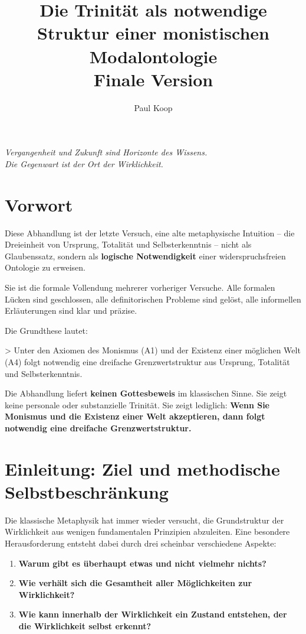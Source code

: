 \documentclass[
]{article}
\title{Die Trinität als notwendige Struktur einer monistischen Modalontologie \\ \large Finale Version}
\author{Paul Koop}
\date{}
\begin{document}
\maketitle

\begin{center}
\emph{Vergangenheit und Zukunft sind Horizonte des Wissens. \\ Die Gegenwart ist der Ort der Wirklichkeit.}
\end{center}

\newpage
{
\setcounter{tocdepth}{3}
\tableofcontents
}
\newpage

\section{Vorwort}\label{vorwort}

Diese Abhandlung ist der letzte Versuch, eine alte metaphysische Intuition – die Dreieinheit von Ursprung, Totalität und Selbsterkenntnis – nicht als Glaubenssatz, sondern als \textbf{logische Notwendigkeit} einer widerspruchsfreien Ontologie zu erweisen.

Sie ist die formale Vollendung mehrerer vorheriger Versuche. Alle formalen Lücken sind geschlossen, alle definitorischen Probleme sind gelöst, alle informellen Erläuterungen sind klar und präzise.

Die Grundthese lautet:

> Unter den Axiomen des Monismus (A1) und der Existenz einer möglichen Welt (A4) folgt notwendig eine dreifache Grenzwertstruktur aus Ursprung, Totalität und Selbsterkenntnis.

Die Abhandlung liefert \textbf{keinen Gottesbeweis} im klassischen Sinne. Sie zeigt keine personale oder substanzielle Trinität. Sie zeigt lediglich: \textbf{Wenn Sie Monismus und die Existenz einer Welt akzeptieren, dann folgt notwendig eine dreifache Grenzwertstruktur.}

\section{Einleitung: Ziel und methodische Selbstbeschränkung}\label{einleitung-ziel-und-methodische-selbstbeschrxe4nkung}

Die klassische Metaphysik hat immer wieder versucht, die Grundstruktur der Wirklichkeit aus wenigen fundamentalen Prinzipien abzuleiten. Eine besondere Herausforderung entsteht dabei durch drei scheinbar verschiedene Aspekte:

\begin{enumerate}
\item \textbf{Warum gibt es überhaupt etwas und nicht vielmehr nichts?}
\item \textbf{Wie verhält sich die Gesamtheit aller Möglichkeiten zur Wirklichkeit?}
\item \textbf{Wie kann innerhalb der Wirklichkeit ein Zustand entstehen, der die Wirklichkeit selbst erkennt?}
\end{enumerate}
\end{document}
